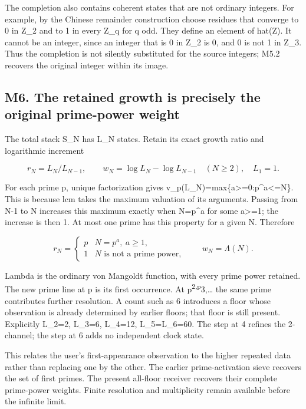 The completion also contains coherent states that are not ordinary
integers. For example, by the Chinese remainder construction choose
residues that converge to 0 in Z\_2 and to 1 in every Z\_q for q odd.
They define an element of hat(Z). It cannot be an integer, since an
integer that is 0 in Z\_2 is 0, and 0 is not 1 in Z\_3. Thus the
completion is not silently substituted for the source integers; M5.2
recovers the original integer within its image.

\subsection{M6. The retained growth is precisely the original
prime-power
weight}\label{m6.-the-retained-growth-is-precisely-the-original-prime-power-weight}

The total stack S\_N has L\_N states. Retain its exact growth ratio and
logarithmic increment

\[
r_N=L_N/L_{N-1},\qquad
w_N=\log L_N-\log L_{N-1}\quad(N\ge2),\quad L_1=1.
\tag{M6.1}
\]

For each prime p, unique factorization gives
v\_p(L\_N)=max\{a\textgreater=0:p\^{}a\textless=N\}. This is because lcm
takes the maximum valuation of its arguments. Passing from N-1 to N
increases this maximum exactly when N=p\^{}a for some a\textgreater=1;
the increase is then 1. At most one prime has this property for a given
N. Therefore

\[
r_N=\begin{cases}p&N=p^a,\ a\ge1,\\1&N\text{ is not a prime power},\end{cases}
\qquad
\boxed{w_N=\Lambda(N).}
\tag{M6.2}
\]

Lambda is the ordinary von Mangoldt function, with every prime power
retained. The new prime line at p is its first occurrence. At
p\textsuperscript{2,p}3,\ldots{} the same prime contributes further
resolution. A count such as 6 introduces a floor whose observation is
already determined by earlier floors; that floor is still present.
Explicitly L\_2=2, L\_3=6, L\_4=12, L\_5=L\_6=60. The step at 4 refines
the 2-channel; the step at 6 adds no independent clock state.

This relates the user's first-appearance observation to the higher
repeated data rather than replacing one by the other. The earlier
prime-activation sieve recovers the set of first primes. The present
all-floor receiver recovers their complete prime-power weights. Finite
resolution and multiplicity remain available before the infinite limit.

